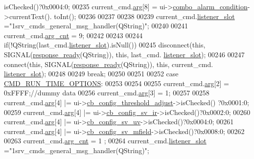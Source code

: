 \begin{DoxyCode}
      isChecked()?0x0004:0;
00235             current\_cmd.\hyperlink{a00004_a56e6c2d7315d0ae60a51e8b140c9cfe4}{arg}[8]      = ui->\hyperlink{a00080_a2af463e4a88fddd219f2e41a386fbd68}{combo\_alarm\_condition}->currentText().
      toInt();
00236 
00237 
00238 
00239             current\_cmd.\hyperlink{a00004_abb76d8edb39876deb60975c8fd784b3f}{listener\_slot}   =\textcolor{stringliteral}{"1srv\_cmds\_general\_msg\_handler(QString)"};
00240 
00241             current\_cmd.\hyperlink{a00004_affcea772a1bc5362ebbc274b6166f81b}{arg\_cnt}     = 9;
00242 
00243 
00244             \textcolor{keywordflow}{if}(!QString(last\_cmd.\hyperlink{a00004_abb76d8edb39876deb60975c8fd784b3f}{listener\_slot}).isNull())
00245             disconnect(\textcolor{keyword}{this}, SIGNAL(\hyperlink{a00017_a3f6396874778799cf07a7a0149e54977}{response\_ready}(QString)), \textcolor{keyword}{this}, last\_cmd.
      \hyperlink{a00004_abb76d8edb39876deb60975c8fd784b3f}{listener\_slot});
00246 
00247             connect(\textcolor{keyword}{this}, SIGNAL(\hyperlink{a00017_a3f6396874778799cf07a7a0149e54977}{response\_ready}(QString)), \textcolor{keyword}{this}, current\_cmd.
      \hyperlink{a00004_abb76d8edb39876deb60975c8fd784b3f}{listener\_slot});
00248 
00249         \textcolor{keywordflow}{break};
00250 
00251 
00252     \textcolor{keywordflow}{case} \hyperlink{a00086_a1d8673a7ca545f3e382fc538f543ab72}{CMD\_RUN\_TIME\_OPTIONS}:
00253 
00254 
00255             current\_cmd.\hyperlink{a00004_a56e6c2d7315d0ae60a51e8b140c9cfe4}{arg}[2]   = 0xFFFF;\textcolor{comment}{//dummy data}
00256             current\_cmd.\hyperlink{a00004_a56e6c2d7315d0ae60a51e8b140c9cfe4}{arg}[3]   = 1;
00257 
00258             current\_cmd.\hyperlink{a00004_a56e6c2d7315d0ae60a51e8b140c9cfe4}{arg}[4]  |= ui->\hyperlink{a00080_a433ffc427e1103e6c2939f949ee5e5b5}{cb\_config\_threshold\_adjust}->isChecked()
      ?0x0001:0;
00259             current\_cmd.\hyperlink{a00004_a56e6c2d7315d0ae60a51e8b140c9cfe4}{arg}[4]  |= ui->\hyperlink{a00080_a4db3ccfbbf8c5222dd2f042d3073bbe8}{cb\_config\_sv\_ir}->isChecked()?0x0002:0;
00260             current\_cmd.\hyperlink{a00004_a56e6c2d7315d0ae60a51e8b140c9cfe4}{arg}[4]  |= ui->\hyperlink{a00080_a3a93cd0a3f3738aad252d063a8677839}{cb\_config\_sv\_uv}->isChecked()?0x0004:0;
00261             current\_cmd.\hyperlink{a00004_a56e6c2d7315d0ae60a51e8b140c9cfe4}{arg}[4]  |= ui->\hyperlink{a00080_a0a83284035ab2dbaeb39946522434986}{cb\_config\_sv\_mfield}->isChecked()?0x0008:0;
00262 
00263             current\_cmd.\hyperlink{a00004_affcea772a1bc5362ebbc274b6166f81b}{arg\_cnt}  = 1 ;
00264             current\_cmd.\hyperlink{a00004_abb76d8edb39876deb60975c8fd784b3f}{listener\_slot} =\textcolor{stringliteral}{"1srv\_cmds\_general\_msg\_handler(QString)"};

\end{DoxyCode}
